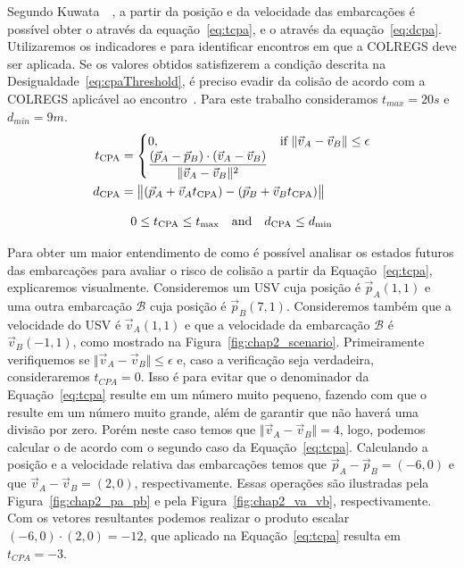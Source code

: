         Segundo Kuwata~\etal~\cite{Kuwata2014Safe}, a partir da posição \pos e da velocidade \vel das embarcações é possível obter o \tcpa através da equação~\eqref{eq:tcpa}, e o \dcpa através da equação~\eqref{eq:dcpa}. Utilizaremos os indicadores \tcpa e \dcpa para identificar encontros em que a COLREGS deve ser aplicada. Se os valores obtidos satisfizerem a condição descrita na Desigualdade~\eqref{eq:cpaThreshold}, é preciso evadir da colisão de acordo com a COLREGS aplicável ao encontro~\cite{Kuwata2014Safe}. Para este trabalho consideramos $t_{max} = 20s$ e $d_{min} = 9m$.
        \begin{align}
            t_{\rm CPA} &=
            \begin{cases}
                0, & \text{if } \Vert\vec{v}_{A}-\vec{v}_{B}\Vert\leq\epsilon\\
                \displaystyle{{(\vec{p}_{A}-\vec{p}_{B})\cdot(\vec{v}_{A}-\vec{v}_{B})}\over{\Vert\vec{v}_{A}-\vec{v}_{B}\Vert^{2}}}
            \end{cases}\label{eq:tcpa}\\
            d_{\rm CPA} &=\bigl\Vert (\vec{p}_{A}+\vec{v}_{A}t_{\rm CPA})-(\vec{p}_{B}+\vec{v}_{B}t_{\rm CPA})\bigr\Vert\label{eq:dcpa}
        \end{align}
        
        \begin{equation}\label{eq:cpaThreshold}
            0\leq t_{\rm CPA}\leq t_{\max}\quad{\hbox {and}}\quad d_{\rm CPA}\leq d_{\min}
        \end{equation}
    
        Para obter um maior entendimento de como é possível analisar os estados futuros das embarcações para avaliar o risco de colisão a partir da Equação~\ref{eq:tcpa}, explicaremos visualmente. Consideremos um USV cuja posição é $\vec{p}_{A}(1,1)$ e uma outra embarcação $\mathcal{B}$ cuja posição é $\vec{p}_{B}(7,1)$. Consideremos também que a velocidade do USV é $\vec{v}_{A}(1,1)$ e que a velocidade da embarcação $\mathcal{B}$ é $\vec{v}_{B}(-1,1)$, como mostrado na Figura~\ref{fig:chap2_scenario}.
        Primeiramente verifiquemos se $\Vert\vec{v}_{A}-\vec{v}_{B}\Vert\leq\epsilon$ e, caso a verificação seja verdadeira, consideraremos $t_{CPA} = 0$. Isso é para evitar que o denominador da Equação~\ref{eq:tcpa} resulte em um número muito pequeno, fazendo com que o \tcpa resulte em um número muito grande, além de garantir que não haverá uma divisão por zero. Porém neste caso temos que $\Vert\vec{v}_{A}-\vec{v}_{B}\Vert = 4$, logo, podemos calcular o \tcpa de acordo com o segundo caso da Equação~\ref{eq:tcpa}. Calculando a posição e a velocidade relativa das embarcações temos que $\vec{p}_{A}-\vec{p}_{B} = (-6,0)$ e que $\vec{v}_{A}-\vec{v}_{B} = (2,0)$, respectivamente. Essas operações são ilustradas pela Figura~\ref{fig:chap2_pa_pb} e pela Figura~\ref{fig:chap2_va_vb}, respectivamente. Com os vetores resultantes podemos realizar o produto escalar $(-6,0)\cdot(2,0) = -12$, que aplicado na Equação~\ref{eq:tcpa} resulta em $t_{CPA} = -3$.
    
